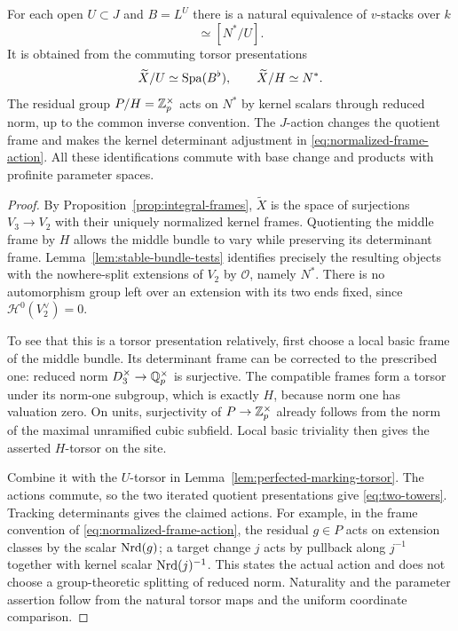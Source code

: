 \begin{theorem}
\label{thm:two-towers}
For each open $U\subset J$ and $B=L^U$ there is a natural equivalence
of $v$-stacks over $k$
\begin{equation}
 [\Spa(B^\flat)/H]\simeq[N^*/U].
 \label{eq:two-towers}
\end{equation}
It is obtained from the commuting torsor presentations
\[
 \widetilde X/U\simeq\operatorname{Spa}(B^\flat),\qquad
 \widetilde X/H\simeq N^*.
\]
The residual group $P/H=\mathbb Z_p^\times$ acts on $N^*$ by kernel
scalars through reduced norm, up to the common inverse convention.
The $J$-action changes the quotient frame and makes the kernel
determinant adjustment in
\eqref{eq:normalized-frame-action}.  All these identifications
commute with base change and products with profinite parameter spaces.
\end{theorem}

\begin{proof}
By Proposition~\ref{prop:integral-frames}, $\widetilde X$ is the
space of surjections $V_3\to V_2$ with their uniquely normalized
kernel frames.  Quotienting the middle frame by $H$ allows the
middle bundle to vary while preserving its determinant frame.
Lemma~\ref{lem:stable-bundle-tests} identifies precisely the
resulting objects with the nowhere-split extensions of $V_2$ by
$\mathcal O$, namely $N^*$.  There is no automorphism group left
over an extension with its two ends fixed, since
$\mathcal H^0(V_2^\vee)=0$.

To see that this is a torsor presentation relatively, first choose
a local basic frame of the middle bundle.  Its determinant frame
can be corrected to the prescribed one: reduced norm
$D_3^\times\to\mathbb Q_p^\times$ is surjective.  The compatible frames
form a torsor under its norm-one subgroup, which is exactly $H$,
because norm one has valuation zero.  On units, surjectivity of
$P\to\mathbb Z_p^\times$ already follows from the norm of the maximal
unramified cubic subfield.  Local basic triviality then gives the
asserted $H$-torsor on the site.

Combine it with the $U$-torsor in
Lemma~\ref{lem:perfected-marking-torsor}.  The actions commute, so
the two iterated quotient presentations give
\eqref{eq:two-towers}.  Tracking determinants gives the claimed
actions.  For example, in the frame convention of
\eqref{eq:normalized-frame-action}, the residual $g\in P$ acts
on extension classes by the scalar $\operatorname{Nrd}(g)$; a target change
$j$ acts by pullback along $j^{-1}$ together with kernel scalar
$\operatorname{Nrd}(j)^{-1}$.  This states the actual action and does not choose
a group-theoretic splitting of reduced norm.  Naturality and the
parameter assertion follow from the natural torsor maps and the
uniform coordinate comparison.
\end{proof}

